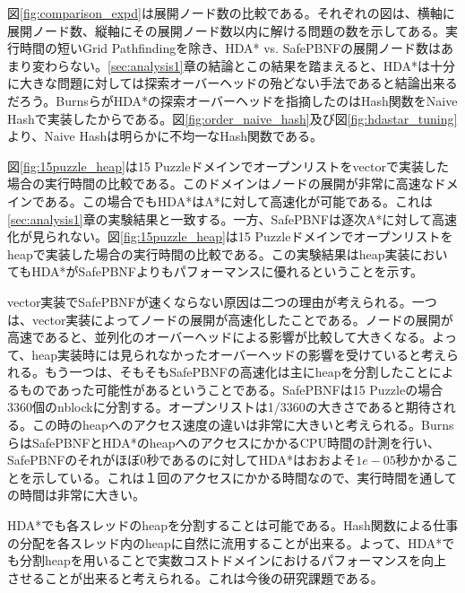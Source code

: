 \documentclass[uplatex]{jsarticle}
\begin{document}
図\ref{fig:comparison_expd}は展開ノード数の比較である。それぞれの図は、横軸に展開ノード数、縦軸にその展開ノード数以内に解ける問題の数を示してある。実行時間の短いGrid Pathfindingを除き、HDA* vs. SafePBNFの展開ノード数はあまり変わらない。\ref{sec:analysis1}章の結論とこの結果を踏まえると、HDA*は十分に大きな問題に対しては探索オーバーヘッドの殆どない手法であると結論出来るだろう。BurnsらがHDA*の探索オーバーヘッドを指摘したのはHash関数をNaive Hashで実装したからである。図\ref{fig:order_naive_hash}及び図\ref{fig:hdastar_tuning}より、Naive Hashは明らかに不均一なHash関数である。
\newline

図\ref{fig:15puzzle_heap}は15 Puzzleドメインでオープンリストをvectorで実装した場合の実行時間の比較である。このドメインはノードの展開が非常に高速なドメインである。この場合でもHDA*はA*に対して高速化が可能である。これは\ref{sec:analysis1}章の実験結果と一致する。一方、SafePBNFは逐次A*に対して高速化が見られない。図\ref{fig:15puzzle_heap}は15 Puzzleドメインでオープンリストをheapで実装した場合の実行時間の比較である。この実験結果はheap実装においてもHDA*がSafePBNFよりもパフォーマンスに優れるということを示す。
\newline

vector実装でSafePBNFが速くならない原因は二つの理由が考えられる。一つは、vector実装によってノードの展開が高速化したことである。ノードの展開が高速であると、並列化のオーバーヘッドによる影響が比較して大きくなる。よって、heap実装時には見られなかったオーバーヘッドの影響を受けていると考えられる。もう一つは、そもそもSafePBNFの高速化は主にheapを分割したことによるものであった可能性があるということである。SafePBNFは15 Puzzleの場合3360個のnblockに分割する。オープンリストは1/3360の大きさであると期待される。この時のheapへのアクセス速度の違いは非常に大きいと考えられる。BurnsらはSafePBNFとHDA*のheapへのアクセスにかかるCPU時間の計測を行い、SafePBNFのそれがほぼ0秒であるのに対してHDA*はおおよそ$1e-05$秒かかることを示している\cite{Burns2010}。これは１回のアクセスにかかる時間なので、実行時間を通しての時間は非常に大きい。
\newline

HDA*でも各スレッドのheapを分割することは可能である。Hash関数による仕事の分配を各スレッド内のheapに自然に流用することが出来る。よって、HDA*でも分割heapを用いることで実数コストドメインにおけるパフォーマンスを向上させることが出来ると考えられる。これは今後の研究課題である。


\end{document}
